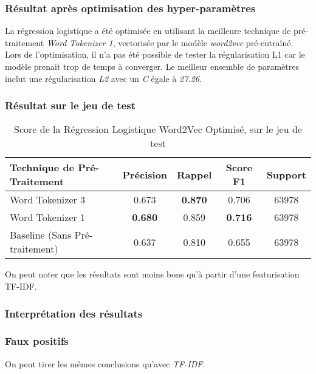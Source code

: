 \subsubsection{Résultat après optimisation des hyper-paramètres}
La régression logistique a été optimisée en utilisant la meilleure technique de pré-traitement \textit{Word Tokenizer 1}, vectorisée par le modèle \textit{word2vec} pré-entraîné. 
Lors de l'optimisation, il n'a pas été possible de tester la régularisation L1 car le modèle prenait trop de temps à converger.
Le meilleur ensemble de paramètres inclut une régularisation \textit{L2} avec un \textit{C} égale à \textit{27.26}.


\subsubsection{Résultat sur le jeu de test}
\begin{table}[ht]
    \centering
    \caption{Score de la Régression Logistique Word2Vec Optimisé, sur le jeu de test}
    \begin{tabular}{lcccc}
    \hline
    \textbf{Technique de Pré-Traitement} & \textbf{Précision} & \textbf{Rappel} & \textbf{Score F1} & \textbf{Support} \\ \hline
    Word Tokenizer 3                          & 0.673              & \textbf{0.870}           & 0.706            & 63978            \\\hline
    Word Tokenizer 1                          & \textbf{0.680}              & 0.859           & \textbf{0.716}             & 63978            \\\hline
    Baseline (Sans Pré-traitement)           & 0.637              & 0.810           & 0.655             & 63978            \\ \hline
\end{tabular}
\label{tab:results}
\end{table}

On peut noter que les résultats sont moins bons qu'à partir d'une featurisation TF-IDF.

\subsubsection{Interprétation des résultats}
\subsubsection{Faux positifs}
On peut tirer les mêmes conclusions qu'avec \textit{TF-IDF}.


